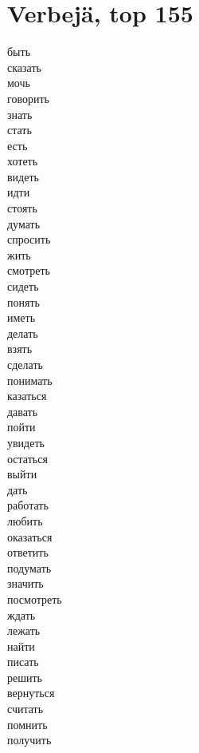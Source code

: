 \documentclass{article}
\begin{document}
\doublespacing

\section*{Verbejä, top 155}

\begin{multicols}{3}
[
]
быть \\
сказать \\
мочь \\
говорить \\
знать \\
стать \\
есть \\
хотеть \\
видеть \\
идти \\
стоять \\
думать \\
спросить \\
жить \\
смотреть \\
сидеть \\
понять \\
иметь \\
делать \\
взять \\
сделать \\
понимать \\
казаться \\
давать \\
пойти \\
увидеть \\
остаться \\
выйти \\
дать \\
работать \\
любить \\
оказаться \\
ответить \\
подумать \\
значить \\
посмотреть \\
ждать \\
лежать \\
найти \\
писать \\
решить \\
вернуться \\
считать \\
помнить \\
получить \\

\end{multicols}
\end{document}
